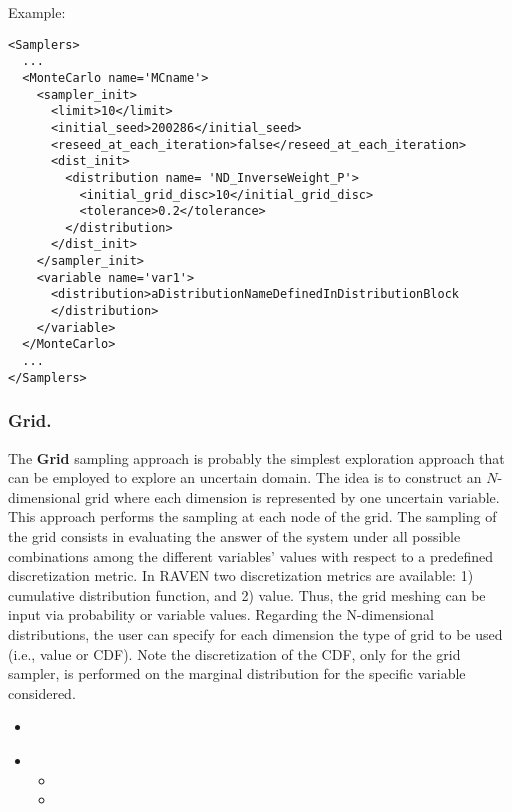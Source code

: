 Example:
\begin{lstlisting}[style=XML]
<Samplers>
  ...
  <MonteCarlo name='MCname'> 
    <sampler_init>
      <limit>10</limit>
      <initial_seed>200286</initial_seed>
      <reseed_at_each_iteration>false</reseed_at_each_iteration>
      <dist_init>
        <distribution name= 'ND_InverseWeight_P'>
          <initial_grid_disc>10</initial_grid_disc>
          <tolerance>0.2</tolerance>
        </distribution>
      </dist_init>
    </sampler_init>
    <variable name='var1'> 
      <distribution>aDistributionNameDefinedInDistributionBlock
      </distribution>  
    </variable> 
  </MonteCarlo>
  ...
</Samplers>
\end{lstlisting}

\subsubsection{Grid.}
\label{subsubsubsec:Grid}
The \textbf{Grid} sampling approach is probably the simplest exploration
approach that can be employed to explore an uncertain domain.
%
The idea is to construct an $N$-dimensional grid where each dimension is
represented by one uncertain variable.
%
This approach performs the sampling at each node of the grid.
%
The sampling of the grid consists in evaluating the answer of the system under
all possible combinations among the different variables' values with respect to
a predefined discretization metric.
%
In RAVEN two discretization metrics are available: 1) cumulative distribution
function, and 2) value.
%
Thus, the grid meshing can be input via probability or variable values.
%
Regarding the N-dimensional distributions, the user can specify for each dimension the type of grid to be used (i.e., value or CDF). Note the discretization of the CDF, only for the grid sampler, is performed on the marginal distribution for the specific variable considered.

%
\attrIntro
\begin{itemize}
\itemsep0em
\item \nameDescription
\end{itemize}
\begin{itemize}
\item \variableDescription
 \variableChildrenIntro
 \begin{itemize}
    \item \distributionDescription
    \item \gridDescription
  \end{itemize}
\end{itemize}

